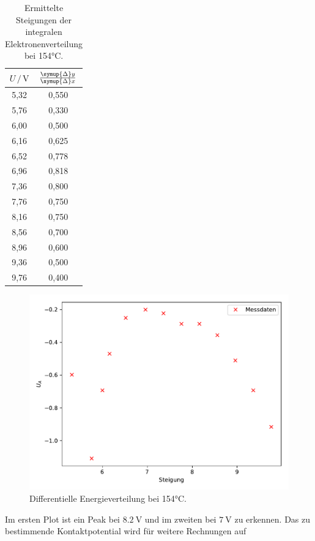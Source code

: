 \begin{table}
  \centering
  \caption{Ermittelte Steigungen der integralen Elektronenverteilung bei 154°C.}
  \label{tab:154}
  \begin{tabular}{c c }
  \toprule
  $ U \,/\, \si{\volt} $ & $\frac{\symup{\Delta}y}{\symup{\Delta}x}$\\
  \midrule 
  5,32 & 0,550\\
  5,76 & 0,330\\
  6,00 & 0,500\\
  6,16 & 0,625\\
  6,52 & 0,778\\
  6,96 & 0,818\\
  7,36 & 0,800\\
  7,76 & 0,750\\
  8,16 & 0,750\\
  8,56 & 0,700\\
  8,96 & 0,600\\
  9,36 & 0,500\\
  9,76 & 0,400\\
  \bottomrule
  \end{tabular}
  \end{table}

\begin{figure}
  \centering
  \includegraphics{content/plot2.pdf}
  \caption{Differentielle Energieverteilung bei 154°C.}
  \label{fig:plot2}
\end{figure}

Im ersten Plot ist ein Peak bei $\SI{8.2}{\volt}$ und im zweiten bei $\SI{7}{\volt}$ zu erkennen. 
Das zu bestimmende Kontaktpotential wird für weitere Rechnungen auf 

